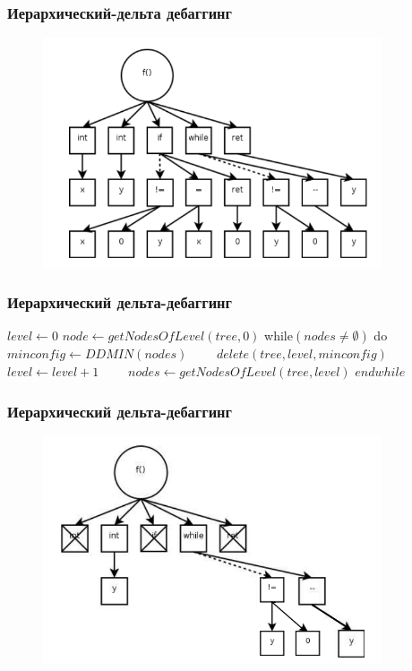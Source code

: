\begin{frame}
	\frametitle{Иерархический-дельта дебаггинг}
	\begin{figure}
		\includegraphics[width=100mm]{image/hddexample}
	\end{figure}	
\end{frame}


\begin{frame}
	\frametitle{Иерархический дельта-дебаггинг}
	\begin{algorithmic}
		\State $level \gets 0$
		\State $node \gets getNodesOfLevel(tree, 0)$
		\State while$(nodes \neq \emptyset)$ do
		\State \ \ \ \ $minconfig \gets DDMIN(nodes)$
		\State \ \ \ \ $delete(tree, level, minconfig)$
		\State \ \ \ \ $level \gets level + 1$
		\State \ \ \ \ $nodes \gets getNodesOfLevel(tree, level)$
		\State $end while$
		
	\end{algorithmic}
\end{frame}



\begin{frame}
	\frametitle{Иерархический дельта-дебаггинг}
	\begin{figure}
		\includegraphics[width=100mm]{image/hdd}
	\end{figure}	
\end{frame}

